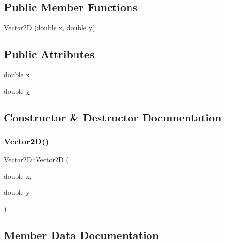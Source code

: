 \subsection*{Public Member Functions}
\begin{DoxyCompactItemize}
\item 
\hyperlink{class_vector2_d_a525e125aac4c844f04c52ddb0e75d594}{Vector2D} (double \hyperlink{class_vector2_d_ac5c4e553815737aa24bec8281270178f}{x}, double \hyperlink{class_vector2_d_ac38d0179cfe74c30fee290a703ab209a}{y})
\end{DoxyCompactItemize}
\subsection*{Public Attributes}
\begin{DoxyCompactItemize}
\item 
double \hyperlink{class_vector2_d_ac5c4e553815737aa24bec8281270178f}{x}
\item 
double \hyperlink{class_vector2_d_ac38d0179cfe74c30fee290a703ab209a}{y}
\end{DoxyCompactItemize}


\subsection{Constructor \& Destructor Documentation}
\mbox{\label{class_vector2_d_a525e125aac4c844f04c52ddb0e75d594}} 
\subsubsection{\texorpdfstring{Vector2\+D()}{Vector2D()}}
{\footnotesize\ttfamily Vector2\+D\+::\+Vector2D (\begin{DoxyParamCaption}\item[{double}]{x,  }\item[{double}]{y }\end{DoxyParamCaption})\hspace{0.3cm}{\ttfamily [inline]}}



\subsection{Member Data Documentation}
\mbox{\label{class_vector2_d_ac5c4e553815737aa24bec8281270178f}} 
